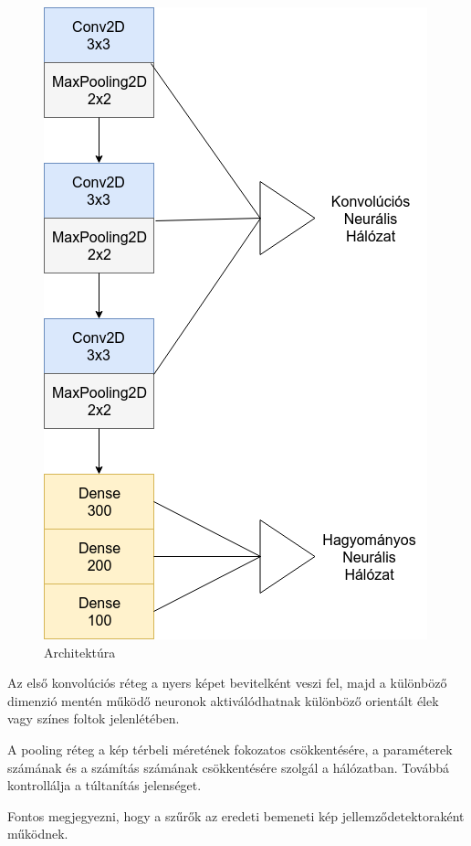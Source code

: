 \begin{figure}[h]
\centering
\includegraphics[scale=0.45]{images/cnn_architecture}
\caption{Architektúra}
\label{fig:cnn_arch}
\end{figure}

Az első konvolúciós réteg a nyers képet bevitelként veszi fel, majd a különböző dimenzió mentén működő neuronok aktiválódhatnak különböző orientált élek vagy színes foltok jelenlétében.

A pooling réteg a kép térbeli méretének fokozatos csökkentésére, a paraméterek számának és a számítás számának csökkentésére szolgál a hálózatban. Továbbá kontrollálja a túltanítás jelenséget.

Fontos megjegyezni, hogy a szűrők az eredeti bemeneti kép jellemződetektoraként működnek.

